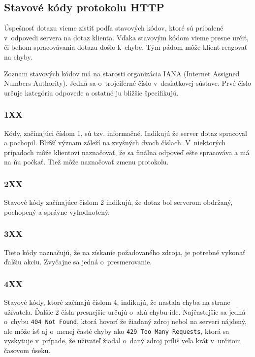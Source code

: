 \documentclass[slovak,cprint]{fitthesis} %
\begin{document}
\subsection{Stavové kódy protokolu HTTP}
Úspešnosť dotazu vieme zistiť podľa stavových kódov, ktoré sú pribalené v~odpovedi servera na dotaz klienta. Vďaka stavovým kódom vieme presne určiť, či behom spracovávania dotazu došlo k~chybe. Tým pádom môže klient reagovať na chyby.

Zoznam stavových kódov má na starosti organizácia IANA (Internet Assigned Numbers Authority). Jedná sa o~trojciferné číslo v~desiatkovej sústave. Prvé číslo určuje kategóriu odpovede a ostatné ju bližšie špecifikujú.

\subsubsection{1XX}
Kódy, začínajúci číslom 1, sú tzv. informačné. Indikujú že server dotaz spracoval a pochopil. Bližší význam záleží na zvyšných dvoch číslach. V~niektorých prípadoch môže klientovi naznačovať, že sa finálna odpoveď ešte spracováva a má na ňu počkať. Tiež môže naznačovať zmenu protokolu.

\label{2XX}
\subsubsection{2XX}
Stavové kódy začínajúce číslom 2 indikujú, že dotaz bol serverom obdržaný, pochopený a správne vyhodnotený.

\subsubsection{3XX}
Tieto kódy naznačujú, že na získanie požadovaného zdroja, je potrebné vykonať ďalšiu akciu. Zvyčajne sa jedná o~presmerovanie.

\label{4XX}
\subsubsection{4XX}
Stavové kódy, ktoré začínajú číslom 4, indikujú, že nastala chyba na strane užívateľa. Ďalšie 2 čísla presnejšie určujú o~akú chybu ide. Najčastejšie sa jedná o~chybu \texttt{404 Not Found}, ktorá hovorí že žiadaný zdroj nebol na serveri nájdený, ale môže ísť aj o~menej časté chyby ako \texttt{429 Too Many Requests}, ktorá sa vyskytuje v~prípade, že uživateľ žiadal o~daný zdroj príliš veľa krát v~určitom časovom úseku.

\label{5XX}
\end{document}
